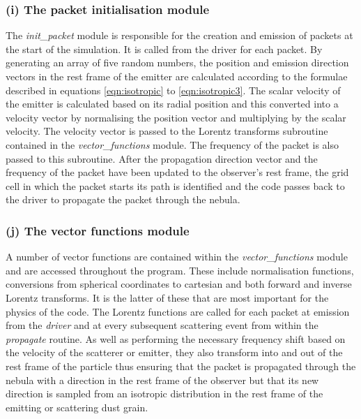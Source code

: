 		\subsubsection{(i) The packet initialisation module}
		The \textit{init\_packet} module is responsible for the creation and emission of packets at the start of the simulation.  It is called from the driver for each packet.  By generating an array of five random numbers, the position and emission direction vectors in the rest frame of the emitter are calculated according to the formulae described in equations \ref{eqn:isotropic} to \ref{eqn:isotropic3}.  The scalar velocity of the emitter is calculated based on its radial position and this converted into a velocity vector by normalising the position vector and multiplying by the scalar velocity.  The velocity vector is passed to the Lorentz transforms subroutine contained in the \textit{vector\_functions}  module.  The frequency of the packet is also passed to this subroutine.  After the propagation direction vector and the frequency of the packet have been updated to the observer's rest frame, the grid cell in which the packet starts its path is identified and the code passes back to the driver to propagate the packet through the nebula.
		
		\subsubsection{(j) The vector functions module}
		A number of vector functions are contained within the \textit{vector\_functions} module and are accessed throughout the program.  These include normalisation functions, conversions from spherical coordinates to cartesian and both forward and inverse Lorentz transforms.  It is the latter of these that are most important for the physics of the code.  The Lorentz functions are called for each packet at emission from the \textit{driver} and at every subsequent scattering event from within the \textit{propagate} routine.  As well as performing the necessary frequency shift based on the velocity of the scatterer or emitter, they also transform into and out of the rest frame of the particle thus ensuring that the packet is propagated through the nebula with a direction in the rest frame of the observer but that its new direction is sampled from an isotropic distribution in the rest frame of the emitting or scattering dust grain.  
		
